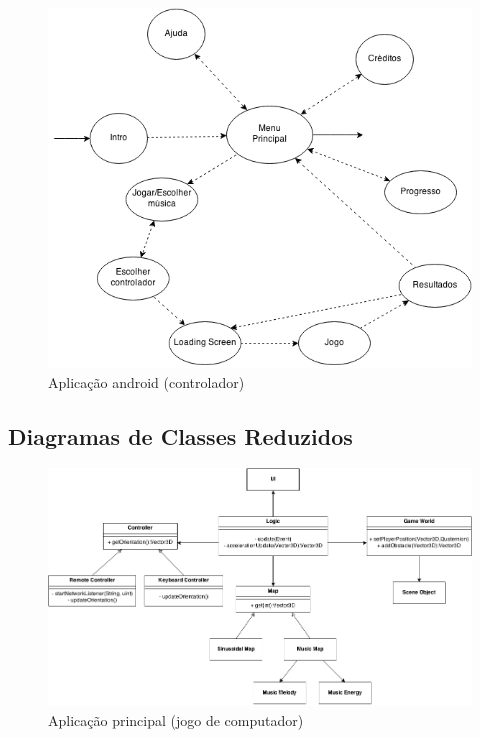 \documentclass{article}
\begin{document}
\begin{figure}[H]
\begin{center}
\includegraphics[scale=0.5]{Navigation.png}
\end{center}
\caption{Aplicação android (controlador)}
\end{figure}

\subsection{Diagramas de Classes Reduzidos}
\begin{figure}[H]
\begin{center}
\includegraphics[scale=0.4]{Classes.png}
\end{center}
\caption{Aplicação principal (jogo de computador)}
\end{figure}
\end{document}
